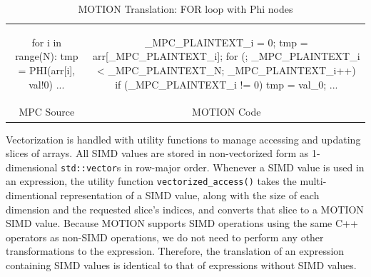 \begin{table}
\begin{tabular}{cc}
\begin{minipage}{0.33\textwidth}
{\small
\begin{pythonn}
for i in range(N):
   tmp = PHI(arr[i], val!0)
	 ...
\end{pythonn}
}
\end{minipage}

&

\begin{minipage}{0.66\textwidth}
{\small
\begin{cppp}
_MPC_PLAINTEXT_i = 0;
tmp = arr[_MPC_PLAINTEXT_i];
for (; _MPC_PLAINTEXT_i < _MPC_PLAINTEXT_N; _MPC_PLAINTEXT_i++) {
   if (_MPC_PLAINTEXT_i != 0) {
      tmp = val_0;
	 }
	 ...
}
\end{cppp}
}
\end{minipage}

\\

MPC Source & MOTION Code
\end{tabular}
\caption{MOTION Translation: FOR loop with Phi nodes}
\label{tab:motion_translation_for_loop}
\end{table}

Vectorization is handled with utility functions to manage accessing and updating slices of arrays.  All SIMD values are stored in non-vectorized form as 1-dimensional \texttt{std::vector}s in row-major order.   Whenever a SIMD value is used in an expression, the utility function \texttt{vectorized\_access()} takes the multi-dimentional representation of a SIMD value, along with the size of each dimension and the requested slice's indices, and converts that slice to a MOTION SIMD value.  Because MOTION supports SIMD operations using the same C++ operators as non-SIMD operations, we do not need to perform any other transformations to the expression.   Therefore, the translation of an expression containing SIMD values is identical to that of expressions without SIMD values.

